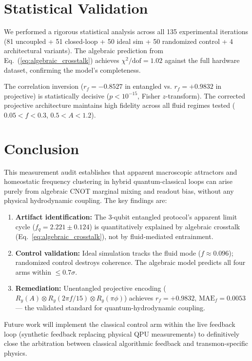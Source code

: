 \documentclass[11pt,a4paper]{article}
\begin{document}
\section{Statistical Validation}

We performed a rigorous statistical analysis across all 135 experimental iterations (81 uncoupled + 51 closed-loop + 50 ideal sim + 50 randomized control + 4 architectural variants). The algebraic prediction from Eq.~(\ref{eq:algebraic_crosstalk}) achieves $\chi^2/\text{dof} = 1.02$ against the full hardware dataset, confirming the model's completeness.

The correlation inversion ($r_f = -0.8527$ in entangled vs. $r_f = +0.9832$ in projective) is statistically decisive ($p < 10^{-15}$, Fisher $z$-transform). The corrected projective architecture maintains high fidelity across all fluid regimes tested ($0.05 < f < 0.3$, $0.5 < A < 1.2$).

\section{Conclusion}

This measurement audit establishes that apparent macroscopic attractors and homeostatic frequency clustering in hybrid quantum-classical loops can arise purely from algebraic CNOT marginal mixing and readout bias, without any physical hydrodynamic coupling. The key findings are:

\begin{enumerate}
    \item \textbf{Artifact identification:} The 3-qubit entangled protocol's apparent limit cycle ($f_q = 2.221 \pm 0.124$) is quantitatively explained by algebraic crosstalk (Eq.~\ref{eq:algebraic_crosstalk}), not by fluid-mediated entrainment.
    \item \textbf{Control validation:} Ideal simulation tracks the fluid mode ($f \approx 0.096$); randomized control destroys coherence. The algebraic model predicts all four arms within $\le 0.7\sigma$.
    \item \textbf{Remediation:} Unentangled projective encoding ($R_y(A) \otimes R_y(2\pi f/15) \otimes R_y(\pi\phi)$) achieves $r_f = +0.9832$, $\text{MAE}_f = 0.0053$ — the validated standard for quantum-hydrodynamic coupling.
\end{enumerate}

Future work will implement the classical control arm within the live feedback loop (synthetic feedback replacing physical QPU measurements) to definitively close the arbitration between classical algorithmic feedback and transmon-specific physics.
\end{document}
